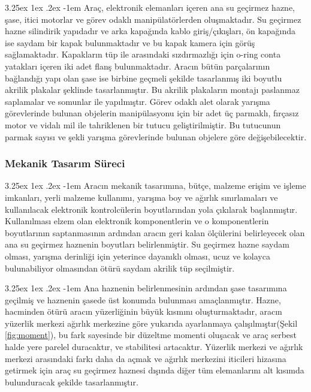 \documentclass[12pt]{article}
\makeatletter
\renewcommand\paragraph{\@startsection{paragraph}{5}{\z@}%
  {3.25ex \@plus1ex \@minus.2ex}%
  {-1em}%
  {\normalfont\normalsize\bfseries}}
\makeatother
\begin{document}
\paragraph{} Araç, elektronik elemanları içeren ana su geçirmez hazne, şase, itici motorlar ve görev odaklı manipülatörlerden oluşmaktadır. Su geçirmez hazne silindirik yapıdadır ve arka kapağında kablo giriş/çıkışları, ön kapağında ise saydam bir kapak bulunmaktadır ve bu kapak kamera için görüş sağlamaktadır. Kapakların tüp ile arasındaki sızdırmazlığı için o-ring conta yatakları içeren iki adet flanş bulunmaktadır. Aracın bütün parçalarının bağlandığı yapı olan şase ise birbine geçmeli şekilde tasarlanmış iki boyutlu akrilik plakalar şeklinde tasarlanmıştır. Bu akrilik plakaların montajı paslanmaz saplamalar ve somunlar ile yapılmıştır. Görev odaklı alet olarak yarışma görevlerinde bulunan objelerin manipülasyonu için bir adet üç parmaklı, fırçasız motor ve vidalı mil ile tahriklenen bir tutucu geliştirilmiştir. Bu tutucunun parmak sayısı ve şekli yarışma görevlerinde bulunan objelere göre değişebilecektir. 


\subsubsection{Mekanik Tasarım Süreci}

\paragraph{} Aracın mekanik tasarımına, bütçe, malzeme erişim  ve işleme imkanları, yerli malzeme kullanımı, yarışma boy ve ağırlık sınırlamaları ve kullanılacak elektronik kontrolcülerin boyutlarından yola çıkılarak başlanmıştır. Kullanılması elzem olan elektronik komponentlerin ve o komponentlerin boyutlarının saptanmasının ardından aracın geri kalan ölçülerini belirleyecek olan ana su geçirmez haznenin boyutları belirlenmiştir. Su geçirmez hazne saydam olması, yarışma derinliği için yeterince dayanıklı olması, ucuz ve kolayca bulunabiliyor olmasından ötürü saydam akrilik tüp seçilmiştir.

\paragraph{} Ana haznenin belirlenmesinin ardından şase tasarımına geçilmiş ve haznenin şasede üst konumda bulunması amaçlanmıştır. Hazne, hacminden ötürü aracın yüzerliğinin büyük kısmını oluşturmaktadır, aracın yüzerlik merkezi ağırlık merkezine göre yukarıda ayarlanmaya çalışılmıştır(Şekil \ref{fig:moment}), bu fark sayesinde bir düzeltme momenti oluşacak ve araç serbest halde yere parelel duracaktır, ve stabilitesi artacaktır.\cite{BOOK:rovmanual} Yüzerlik merkezi ve ağırlık merkezi arasındaki farkı daha da açmak ve ağırlık merkezini iticileri hizasına getirmek için araç su geçirmez haznesi dışında diğer tüm elemanlarını alt kısımda bulunduracak şekilde tasarlanmıştır.
\end{document}
